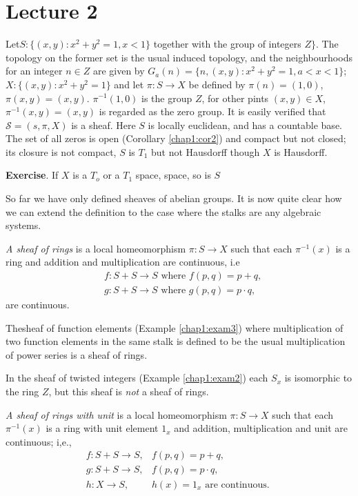 \chapter{Lecture 2}

\begin{exam}%
Let\pageoriginale $S:\{ (x,y): x^2 +y^2 =1, x < 1 \}$ together with
the group of 
integers $Z \}$. The topology on the former set is the usual induced
topology, and the neighbourhoods for an integer $n \in Z$ are given by
$G_a(n)= \{ n,(x,y) : x^2 + y^2 =1 , a< x < 1 \}$; $X:\{ (x,y): x^2 +
y^2 =1 \}$ and let $\pi : S \to X$ be defined by  $\pi (n) = (1,0)$,
$\pi (x,y) = (x,y)$. $\pi^{-1} (1,0)$ is the group $Z$, for other
pints $(x,y) \in X$, $\pi^{-1}(x,y) = (x,y)$ is regarded as the zero
group. It is easily verified that $\mathscr{S}= (s, \pi , X)$ is a
sheaf. Here $S$ is 
locally euclidean, and has a countable base. The set of all zeros is
open (Corollary \ref{chap1:cor2}) and compact but not closed; its
closure is not compact, $S$ is $T_1$ but not Hausdorff though $X$ is
Hausdorff.  
\end{exam}

\noindent
\textbf{Exercise}. 
If $X$ is a $T_o$ or a $T_1$ space, space, so is
$S$ 

So far we have only defined sheaves of abelian groups. It is now quite
clear how we can extend the definition to the case where the stalks
are any algebraic systems. 

\textit{A sheaf of rings} is a local homeomorphism $\pi : S \to X$
such that each $\pi^{-1}(x)$ is a ring and addition and multiplication
are continuous, i.e 
\begin{align*}
& f  : S + S \to S \text{ where } f(p, q) = p + q,\\
& g : S + S \to S \text{ where } g(p, q) = p \cdot q,
\end{align*}
are continuous.

The\pageoriginale sheaf of function elements (Example
\ref{chap1:exam3}) where multiplication of 
two function elements in the same stalk is defined to be the usual
multiplication of power series is a sheaf of rings. 

In the sheaf of twisted integers (Example \ref{chap1:exam2})  each $S_x$ is
isomorphic to the ring $Z$, but this sheaf is \textit{not} a sheaf of
rings. 

\textit{A sheaf of rings with unit} is a local homeomorphism $\pi :S
\to X$ such that each $\pi^{-1}(x)$ is a ring with unit element $1_x$
and addition, multiplication and unit are continuous; i,e., 
\begin{align*}
f:S+ S \to S, & f(p,q) = p+q,\\
g:S+ S \to S, & f(p,q) = p \cdot q,\\
h:X \longrightarrow S, & h(x) = 1_x \text{ are continuous. }
\end{align*} 

